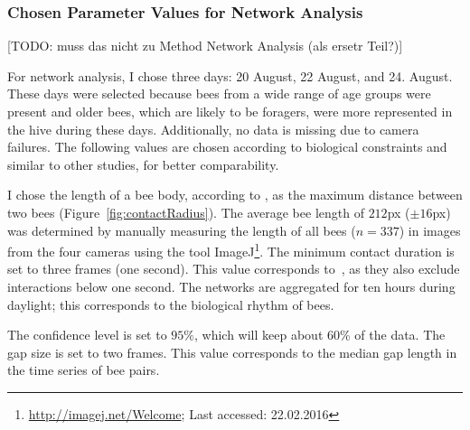 \subsubsection{Chosen Parameter Values for Network Analysis}
[TODO: muss das nicht zu Method Network Analysis (als ersetr Teil?)]

For network analysis, I chose three days: 20 August, 22 August, and 24. August.
These days were selected because bees from a wide range of age groups were present and older bees, which are likely to be foragers, were more represented in the hive during these days.
Additionally, no data is missing due to camera failures.
The following values are chosen according to biological constraints and similar to other studies, for better comparability.

I chose the length of a bee body, according to \textcite{baracchi2014socio}, as the maximum distance between two bees (Figure~\ref{fig:contactRadius}).
The average bee length of $212$px ($\pm 16$px)  was determined by manually measuring the length of all bees ($n=337$) in images from the four cameras using the tool ImageJ\footnote{\url{http://imagej.net/Welcome}; Last accessed:
 22.02.2016}.
The minimum contact duration is set to three frames (one second). This value corresponds to~\textcite{mersch2013tracking}, as they also exclude interactions below one second.
The networks are aggregated for ten hours during daylight; this corresponds to the biological rhythm of bees.

The confidence level is set to $95\%$, which will keep about 60\% of the data.
The gap size is set to two frames. This value corresponds to the median gap length in the time series of bee pairs.

